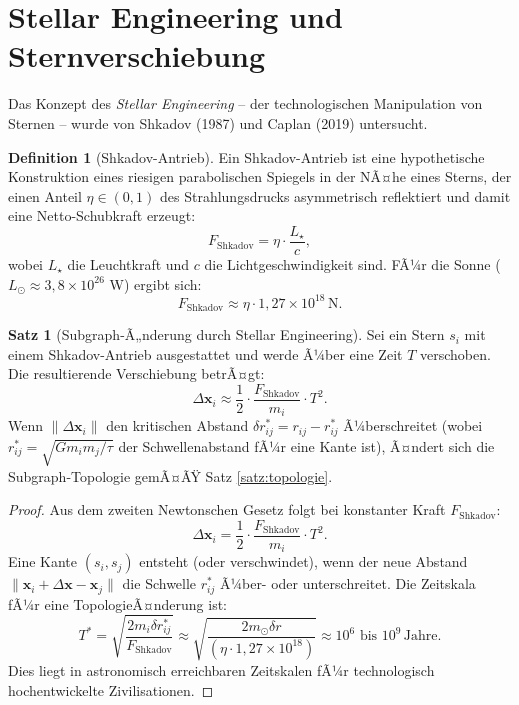 ﻿\documentclass[a4paper,12pt]{report}
\theoremstyle{definition}
\newtheorem{definition}{Definition}
\newtheorem{satz}{Satz}
\begin{document}
\section{Stellar Engineering und Sternverschiebung}

Das Konzept des \emph{Stellar Engineering} -- der technologischen Manipulation von Sternen -- wurde von Shkadov (1987) und Caplan (2019) untersucht.

\begin{definition}[Shkadov-Antrieb]
Ein Shkadov-Antrieb ist eine hypothetische Konstruktion eines riesigen parabolischen Spiegels in der NÃ¤he eines Sterns, der einen Anteil $\eta \in (0,1)$ des Strahlungsdrucks asymmetrisch reflektiert und damit eine Netto-Schubkraft erzeugt:
\[
F_\mathrm{Shkadov} = \eta \cdot \frac{L_\star}{c},
\]
wobei $L_\star$ die Leuchtkraft und $c$ die Lichtgeschwindigkeit sind. FÃ¼r die Sonne ($L_\odot \approx 3{,}8 \times 10^{26}$ W) ergibt sich:
\[
F_\mathrm{Shkadov} \approx \eta \cdot 1{,}27 \times 10^{18} \, \mathrm{N}.
\]
\end{definition}

\begin{satz}[Subgraph-Ã„nderung durch Stellar Engineering]
\label{satz:stellar}
Sei ein Stern $s_i$ mit einem Shkadov-Antrieb ausgestattet und werde Ã¼ber eine Zeit $T$ verschoben. Die resultierende Verschiebung betrÃ¤gt:
\[
\Delta \mathbf{x}_i \approx \frac{1}{2} \cdot \frac{F_\mathrm{Shkadov}}{m_i} \cdot T^2.
\]
Wenn $\|\Delta \mathbf{x}_i\|$ den kritischen Abstand $\delta r_{ij}^* = r_{ij} - r_{ij}^*$ Ã¼berschreitet (wobei $r_{ij}^* = \sqrt{G m_i m_j/\tau}$ der Schwellenabstand fÃ¼r eine Kante ist), Ã¤ndert sich die Subgraph-Topologie gemÃ¤ÃŸ Satz \ref{satz:topologie}.
\end{satz}

\begin{proof}
Aus dem zweiten Newtonschen Gesetz folgt bei konstanter Kraft $F_\mathrm{Shkadov}$:
\[
\Delta \mathbf{x}_i = \frac{1}{2} \cdot \frac{F_\mathrm{Shkadov}}{m_i} \cdot T^2.
\]
Eine Kante $(s_i, s_j)$ entsteht (oder verschwindet), wenn der neue Abstand $\|\mathbf{x}_i + \Delta \mathbf{x} - \mathbf{x}_j\|$ die Schwelle $r_{ij}^*$ Ã¼ber- oder unterschreitet. Die Zeitskala fÃ¼r eine TopologieÃ¤nderung ist:
\[
T^* = \sqrt{\frac{2 m_i \delta r_{ij}^*}{F_\mathrm{Shkadov}}} \approx \sqrt{\frac{2 m_\odot \delta r}{(\eta \cdot 1{,}27 \times 10^{18})}} \approx 10^6 \text{ bis } 10^9 \, \text{Jahre}.
\]
Dies liegt in astronomisch erreichbaren Zeitskalen fÃ¼r technologisch hochentwickelte Zivilisationen.
\end{proof}
\end{document}
